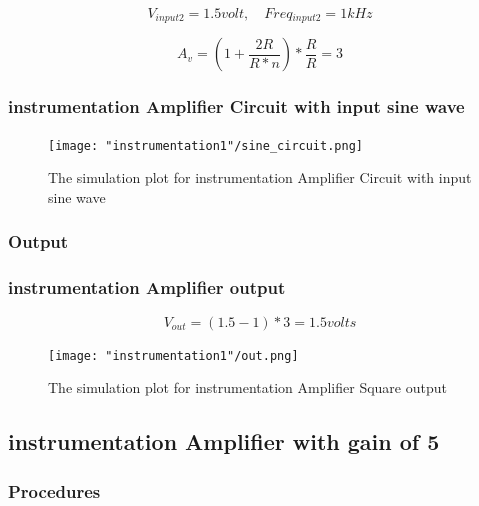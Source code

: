 \documentclass{article}
\begin{document}
	\begin{equation}
	V{_{input2}} = 1.5 { volt}, \quad {Freq}{_{input2}} = 1 {kHz}
	\end{equation}
	
	\begin{equation}
	A_{v} = \left(1 + \frac{2 R}{R * n}\right) *\frac{R}{R} = 3
	\end{equation}
	
	
	\subsubsection{instrumentation Amplifier Circuit with input sine wave}
	\begin{figure}[H]
		\centering
		\texttt{[image: "instrumentation1"/sine\_circuit.png]}
		\caption{The simulation plot for instrumentation Amplifier Circuit with input sine wave}
		\label{fig:ins_circuit}
	\end{figure}
	
	\subsubsection{Output}
	
	\subsubsection{instrumentation Amplifier output}
	\begin{equation}
		V{_{out}} = (1.5 - 1)  * 3 = 1.5 {volts}
	\end{equation}
	\begin{figure}[H]
		\centering
		\texttt{[image: "instrumentation1"/out.png]}
		\caption{The simulation plot for instrumentation Amplifier Square output}
		\label{fig:out2}
	\end{figure}
	

	

	
	
	
	\subsection{instrumentation Amplifier with gain of 5}
	
	\subsubsection{Procedures}
	
\end{document}
